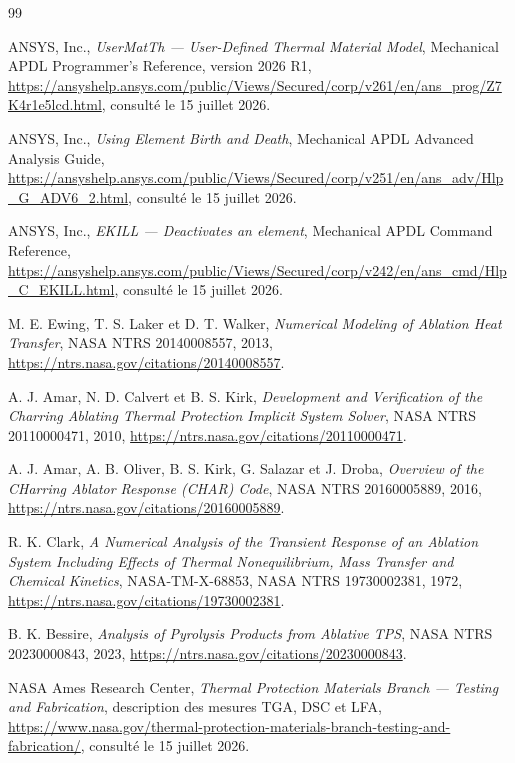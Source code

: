 \documentclass[oneside,openany]{amsdtx}
\begin{document}
\clearpage
\begin{thebibliography}{99}

ANSYS, Inc., \emph{UserMatTh --- User-Defined Thermal Material Model},
Mechanical APDL Programmer's Reference, version 2026 R1,
\url{https://ansyshelp.ansys.com/public/Views/Secured/corp/v261/en/ans_prog/Z7K4r1e5lcd.html},
consulté le 15 juillet 2026.

ANSYS, Inc., \emph{Using Element Birth and Death}, Mechanical APDL Advanced
Analysis Guide,
\url{https://ansyshelp.ansys.com/public/Views/Secured/corp/v251/en/ans_adv/Hlp_G_ADV6_2.html},
consulté le 15 juillet 2026.

ANSYS, Inc., \emph{EKILL --- Deactivates an element}, Mechanical APDL Command
Reference,
\url{https://ansyshelp.ansys.com/public/Views/Secured/corp/v242/en/ans_cmd/Hlp_C_EKILL.html},
consulté le 15 juillet 2026.

M. E. Ewing, T. S. Laker et D. T. Walker, \emph{Numerical Modeling of
Ablation Heat Transfer}, NASA NTRS 20140008557, 2013,
\url{https://ntrs.nasa.gov/citations/20140008557}.

A. J. Amar, N. D. Calvert et B. S. Kirk, \emph{Development and Verification of
the Charring Ablating Thermal Protection Implicit System Solver}, NASA NTRS
20110000471, 2010,
\url{https://ntrs.nasa.gov/citations/20110000471}.

A. J. Amar, A. B. Oliver, B. S. Kirk, G. Salazar et J. Droba,
\emph{Overview of the CHarring Ablator Response (CHAR) Code}, NASA NTRS
20160005889, 2016,
\url{https://ntrs.nasa.gov/citations/20160005889}.

R. K. Clark, \emph{A Numerical Analysis of the Transient Response of an
Ablation System Including Effects of Thermal Nonequilibrium, Mass Transfer and
Chemical Kinetics}, NASA-TM-X-68853, NASA NTRS 19730002381, 1972,
\url{https://ntrs.nasa.gov/citations/19730002381}.

B. K. Bessire, \emph{Analysis of Pyrolysis Products from Ablative TPS}, NASA
NTRS 20230000843, 2023,
\url{https://ntrs.nasa.gov/citations/20230000843}.

NASA Ames Research Center, \emph{Thermal Protection Materials Branch ---
Testing and Fabrication}, description des mesures TGA, DSC et LFA,
\url{https://www.nasa.gov/thermal-protection-materials-branch-testing-and-fabrication/},
consulté le 15 juillet 2026.


\end{thebibliography}
\end{document}

